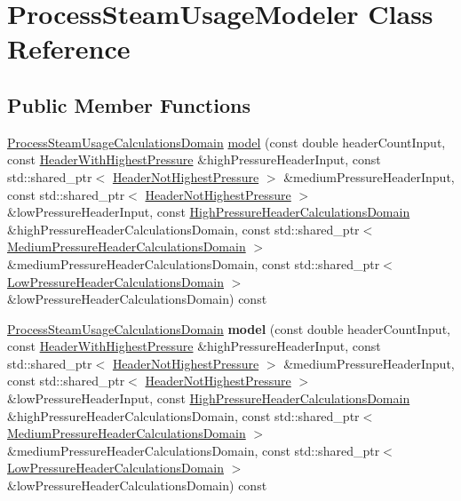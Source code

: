 \hypertarget{class_process_steam_usage_modeler}{}\section{Process\+Steam\+Usage\+Modeler Class Reference}
\label{class_process_steam_usage_modeler}
\subsection*{Public Member Functions}
\begin{DoxyCompactItemize}
\item 
\hyperlink{class_process_steam_usage_calculations_domain}{Process\+Steam\+Usage\+Calculations\+Domain} \hyperlink{class_process_steam_usage_modeler_a109cb58f14a1f81394bf3457ff4a157e}{model} (const double header\+Count\+Input, const \hyperlink{class_header_with_highest_pressure}{Header\+With\+Highest\+Pressure} \&high\+Pressure\+Header\+Input, const std\+::shared\+\_\+ptr$<$ \hyperlink{class_header_not_highest_pressure}{Header\+Not\+Highest\+Pressure} $>$ \&medium\+Pressure\+Header\+Input, const std\+::shared\+\_\+ptr$<$ \hyperlink{class_header_not_highest_pressure}{Header\+Not\+Highest\+Pressure} $>$ \&low\+Pressure\+Header\+Input, const \hyperlink{class_high_pressure_header_calculations_domain}{High\+Pressure\+Header\+Calculations\+Domain} \&high\+Pressure\+Header\+Calculations\+Domain, const std\+::shared\+\_\+ptr$<$ \hyperlink{class_medium_pressure_header_calculations_domain}{Medium\+Pressure\+Header\+Calculations\+Domain} $>$ \&medium\+Pressure\+Header\+Calculations\+Domain, const std\+::shared\+\_\+ptr$<$ \hyperlink{class_low_pressure_header_calculations_domain}{Low\+Pressure\+Header\+Calculations\+Domain} $>$ \&low\+Pressure\+Header\+Calculations\+Domain) const
\item 
\mbox{\label{class_process_steam_usage_modeler_a109cb58f14a1f81394bf3457ff4a157e}} 
\hyperlink{class_process_steam_usage_calculations_domain}{Process\+Steam\+Usage\+Calculations\+Domain} {\bfseries model} (const double header\+Count\+Input, const \hyperlink{class_header_with_highest_pressure}{Header\+With\+Highest\+Pressure} \&high\+Pressure\+Header\+Input, const std\+::shared\+\_\+ptr$<$ \hyperlink{class_header_not_highest_pressure}{Header\+Not\+Highest\+Pressure} $>$ \&medium\+Pressure\+Header\+Input, const std\+::shared\+\_\+ptr$<$ \hyperlink{class_header_not_highest_pressure}{Header\+Not\+Highest\+Pressure} $>$ \&low\+Pressure\+Header\+Input, const \hyperlink{class_high_pressure_header_calculations_domain}{High\+Pressure\+Header\+Calculations\+Domain} \&high\+Pressure\+Header\+Calculations\+Domain, const std\+::shared\+\_\+ptr$<$ \hyperlink{class_medium_pressure_header_calculations_domain}{Medium\+Pressure\+Header\+Calculations\+Domain} $>$ \&medium\+Pressure\+Header\+Calculations\+Domain, const std\+::shared\+\_\+ptr$<$ \hyperlink{class_low_pressure_header_calculations_domain}{Low\+Pressure\+Header\+Calculations\+Domain} $>$ \&low\+Pressure\+Header\+Calculations\+Domain) const

\end{DoxyCompactItemize}
